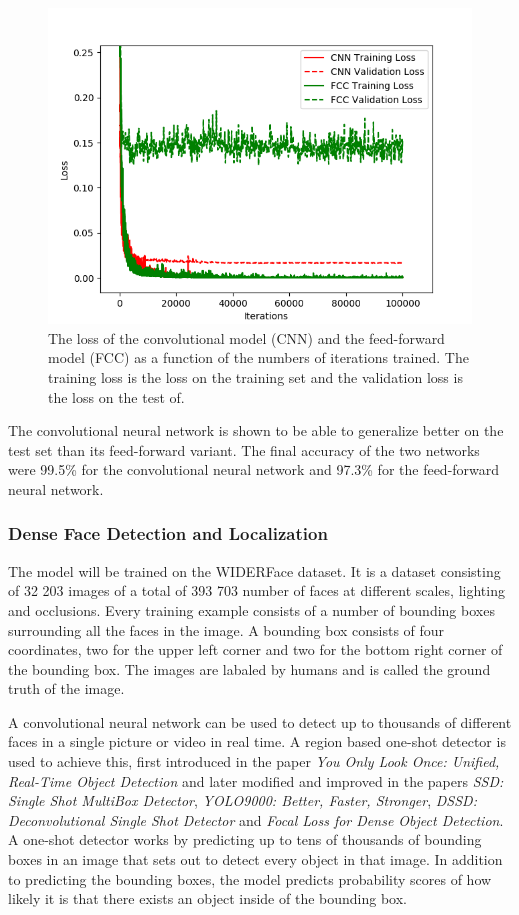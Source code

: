 \documentclass[a4paper,11pt,twoside]{article}
\begin{document}
\begin{figure}[h]
	\centering
  		\includegraphics[scale=0.4]{losses.png}
  	\caption{The loss of the convolutional model (CNN) and the feed-forward model (FCC) as a function of the numbers of iterations trained. The training loss is the loss on the training set and the validation loss is the loss on the test of.} \label{figacc}
\end{figure}

The convolutional neural network is shown to be able to generalize better on the test set than its feed-forward variant. The final accuracy of the two networks were 99.5\% for the convolutional neural network and 97.3\% for the feed-forward neural network. 

\subsubsection{Dense Face Detection and Localization}
The model will be trained on the WIDERFace dataset. It is a dataset consisting of 32 203 images of a total of 393 703 number of faces at different scales, lighting and occlusions. Every training example consists of a number of bounding boxes surrounding all the faces in the image. A bounding box consists of four coordinates, two for the upper left corner and two for the bottom right corner of the bounding box. The images are labaled by humans and is called the ground truth of the image. \cite{WIDERFace}

A convolutional neural network can be used to detect up to thousands of different faces in a single picture or video in real time. A region based one-shot detector is used to achieve this, first introduced in the paper \textit{You Only Look Once: Unified, Real-Time Object Detection} and later modified and improved in the papers \textit{SSD: Single Shot MultiBox Detector}, \textit{YOLO9000: Better, Faster, Stronger}, \textit{DSSD: Deconvolutional Single Shot Detector} and \textit{Focal Loss for Dense Object Detection}. A one-shot detector works by predicting up to tens of thousands of bounding boxes in an image that sets out to detect every object in that image. In addition to predicting the bounding boxes, the model predicts probability scores of how likely it is that there exists an object inside of the bounding box.
\end{document}
